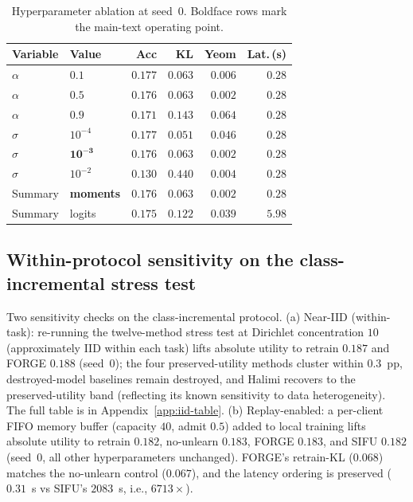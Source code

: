 \begin{table}[t]
\centering
\scriptsize
\setlength{\tabcolsep}{3pt}
\begin{tabular}{llrrrr}
\toprule
Variable & Value & Acc & KL & Yeom & Lat.\,(s) \\
\midrule
$\alpha$ & $0.1$              & $0.177$ & $0.063$ & $0.006$ & $0.28$ \\
$\alpha$ & $\mathbf{0.5}$     & $\mathbf{0.176}$ & $\mathbf{0.063}$ & $\mathbf{0.002}$ & $\mathbf{0.28}$ \\
$\alpha$ & $0.9$              & $0.171$ & $0.143$ & $0.064$ & $0.28$ \\
\midrule
$\sigma$ & $10^{-4}$          & $0.177$ & $0.051$ & $0.046$ & $0.28$ \\
$\sigma$ & $\mathbf{10^{-3}}$ & $\mathbf{0.176}$ & $\mathbf{0.063}$ & $\mathbf{0.002}$ & $\mathbf{0.28}$ \\
$\sigma$ & $10^{-2}$          & $0.130$ & $0.440$ & $0.004$ & $0.28$ \\
\midrule
Summary & \textbf{moments}    & $\mathbf{0.176}$ & $\mathbf{0.063}$ & $\mathbf{0.002}$ & $\mathbf{0.28}$ \\
Summary & logits              & $0.175$ & $0.122$ & $0.039$ & $5.98$ \\
\bottomrule
\end{tabular}
\caption{Hyperparameter ablation at seed~$0$. Boldface rows mark the main-text
operating point.}
\label{tab:ablation}
\end{table}

\subsection{Within-protocol sensitivity on the class-incremental stress test}
\label{sec:results-iid}

Two sensitivity checks on the class-incremental protocol. (a) Near-IID
(within-task): re-running the twelve-method stress test at Dirichlet
concentration $10$ (approximately IID within each task) lifts absolute utility to
retrain $0.187$ and FORGE $0.188$ (seed~0); the four preserved-utility methods
cluster within $0.3$~pp, destroyed-model baselines remain destroyed, and Halimi
recovers to the preserved-utility band (reflecting its known sensitivity to data
heterogeneity). The full table is in Appendix~\ref{app:iid-table}. (b)
Replay-enabled: a per-client FIFO memory buffer (capacity $40$, admit $0.5$)
added to local training lifts absolute utility to retrain $0.182$, no-unlearn
$0.183$, FORGE $0.183$, and SIFU $0.182$ (seed~0, all other hyperparameters
unchanged). FORGE's retrain-KL ($0.068$) matches the no-unlearn control
($0.067$), and the latency ordering is preserved ($0.31$~s vs SIFU's $2083$~s,
i.e., $6713\times$).

